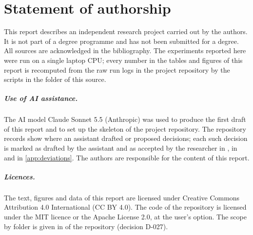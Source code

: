 \chapter*{Statement of authorship}
This report describes an independent research project carried out by the authors. It is not part of a degree programme and has not been submitted for a degree. All sources are acknowledged in the bibliography. The experiments reported here were run on a single laptop CPU; every number in the tables and figures of this report is recomputed from the raw run logs in the project repository by the scripts in the  folder of this source.

\paragraph{Use of AI assistance.} The AI model Claude Sonnet 5.5 (Anthropic) was used to produce the first draft of this report and to set up the skeleton of the project repository. The repository records show where an assistant drafted or proposed decisions; each such decision is marked as drafted by the assistant and as accepted by the researcher in , in  and in \cref{app:deviations}. The authors are responsible for the content of this report.

\paragraph{Licences.} The text, figures and data of this report are licensed under Creative Commons Attribution 4.0 International (CC BY 4.0). The code of the repository is licensed under the MIT licence or the Apache License 2.0, at the user's option. The scope by folder is given in  of the repository (decision D-027).

\vspace{2cm}
\noindent \reportauthors \hfill \reportdate
\cleardoublepage
